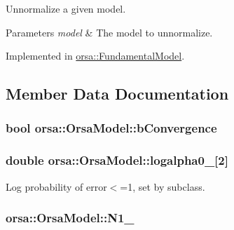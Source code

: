 Unnormalize a given model. 


\begin{DoxyParams}{Parameters}
{\em model} & The model to unnormalize. \\
\hline
\end{DoxyParams}


Implemented in \hyperlink{classorsa_1_1FundamentalModel_a1b305ca23105777011dcf987bdde6998}{orsa\+::\+Fundamental\+Model}.



\subsection{Member Data Documentation}
\hypertarget{classorsa_1_1OrsaModel_a360ddef39b62baaf9bd225765619c8fe}{}
\subsubsection[{b\+Convergence}]{\setlength{\rightskip}{0pt plus 5cm}bool orsa\+::\+Orsa\+Model\+::b\+Convergence\hspace{0.3cm}{\ttfamily [protected]}}\label{classorsa_1_1OrsaModel_a360ddef39b62baaf9bd225765619c8fe}
\hypertarget{classorsa_1_1OrsaModel_a5ebaac101d5e4b50fa3be78af2a5ee5d}{}
\subsubsection[{logalpha0\+\_\+}]{\setlength{\rightskip}{0pt plus 5cm}double orsa\+::\+Orsa\+Model\+::logalpha0\+\_\+\mbox{[}2\mbox{]}\hspace{0.3cm}{\ttfamily [protected]}}\label{classorsa_1_1OrsaModel_a5ebaac101d5e4b50fa3be78af2a5ee5d}


Log probability of error$<$=1, set by subclass. 

\hypertarget{classorsa_1_1OrsaModel_a2a743045785ff7a0bbb96f511d9796df}{}
\subsubsection[{N1\+\_\+}]{ orsa\+::\+Orsa\+Model\+::\+N1\+\_\+\hspace{0.3cm}{\ttfamily [protected]}}\label{classorsa_1_1OrsaModel_a2a743045785ff7a0bbb96f511d9796df}


